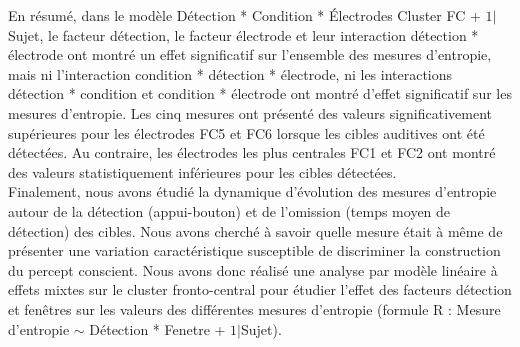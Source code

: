 En résumé, dans le modèle Détection * Condition * Électrodes Cluster FC + $1|$Sujet, le facteur détection, le facteur électrode et leur interaction détection * électrode ont montré un effet significatif sur l'ensemble des mesures d'entropie, mais ni l'interaction condition * détection * électrode, ni les interactions détection * condition et condition * électrode ont montré d'effet significatif sur les mesures d'entropie. 
Les cinq mesures ont présenté des valeurs significativement supérieures pour les électrodes FC5 et FC6 lorsque les cibles auditives ont été détectées. 
Au contraire, les électrodes les plus centrales FC1 et FC2 ont montré des valeurs statistiquement inférieures pour les cibles détectées. \\

Finalement, nous avons étudié la dynamique d'évolution des mesures d'entropie autour de la détection (appui-bouton) et de l'omission (temps moyen de détection) des cibles. 
Nous avons cherché à savoir quelle mesure était à même de présenter une variation caractéristique susceptible de discriminer la construction du percept conscient. 
Nous avons donc réalisé une analyse par modèle linéaire à effets mixtes sur le cluster fronto-central pour étudier l'effet des facteurs détection et fenêtres sur les valeurs des différentes mesures d'entropie (formule R : Mesure d'entropie $\sim$ Détection * Fenetre + $1|$Sujet). 

